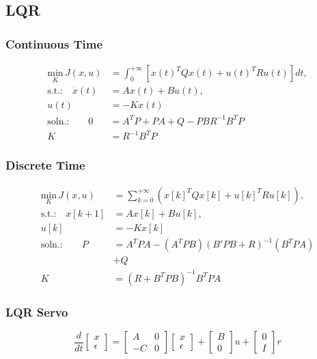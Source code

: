 \subsection{LQR}
\subsubsection{Continuous Time}
    \begin{align*}
        \underset{K}{\text{min}} \, J(x,u) &= \int_{0}^{+\infty}[x(t)^TQx(t) + u(t)^TRu(t)]dt,\\[5pt]
        \text{s.t.:} \quad \dot{x}(t) &= Ax(t) + Bu(t),\\
        u(t) &= -Kx(t)\\[5pt]
        \text{soln.:} \qquad 0 &= A^TP + PA + Q - PBR^{-1}B^TP\\
        K &= R^{-1}B^TP
    \end{align*}

\subsubsection{Discrete Time}
    \begin{align*}
        \underset{K}{\text{min}} \, J(x,u) &= \sum_{k=0}^{+\infty}(x[k]^TQx[k] + u[k]^TRu[k]),\\[5pt]
        \text{s.t.:} \quad x[k+1] &= Ax[k] + Bu[k],\\
        u[k] &= -Kx[k]\\[5pt]
        \text{soln.:} \qquad P &= A^TPA - (A^TPB)(B'PB+R)^{-1}(B^TPA)\\
        &+Q\\
        K &= (R+B^TPB)^{-1}B^TPA
    \end{align*}

\subsubsection{LQR Servo}
    $$
    \frac{d}{dt} \begin{bmatrix} x \\ \epsilon \end{bmatrix} 
    = \begin{bmatrix} A & 0 \\ -C & 0 \end{bmatrix} \begin{bmatrix} x \\ \epsilon \end{bmatrix}
    + \begin{bmatrix} B \\ 0 \end{bmatrix} u + \begin{bmatrix} 0 \\ I \end{bmatrix} r
    $$